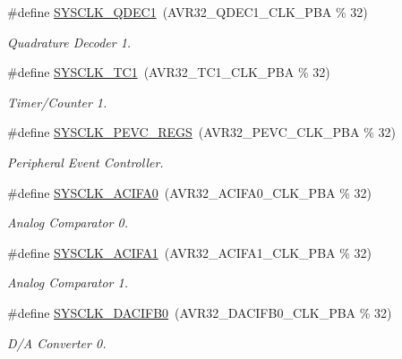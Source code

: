 \begin{DoxyCompactItemize}
\#define \hyperlink{group__sysclk__group_ga82dd53b7213f5e14889c11d00e9172e8}{\-S\-Y\-S\-C\-L\-K\-\_\-\-Q\-D\-E\-C1}~(\-A\-V\-R32\-\_\-\-Q\-D\-E\-C1\-\_\-\-C\-L\-K\-\_\-\-P\-B\-A \% 32)
\begin{DoxyCompactList}\small\item\em \-Quadrature \-Decoder 1. \end{DoxyCompactList}\item 
\#define \hyperlink{group__sysclk__group_ga03be785696a3e76b1b3c6ea6104ac630}{\-S\-Y\-S\-C\-L\-K\-\_\-\-T\-C1}~(\-A\-V\-R32\-\_\-\-T\-C1\-\_\-\-C\-L\-K\-\_\-\-P\-B\-A \% 32)
\begin{DoxyCompactList}\small\item\em \-Timer/\-Counter 1. \end{DoxyCompactList}\item 
\#define \hyperlink{group__sysclk__group_ga399953bbca8665cff37fd74a54196281}{\-S\-Y\-S\-C\-L\-K\-\_\-\-P\-E\-V\-C\-\_\-\-R\-E\-G\-S}~(\-A\-V\-R32\-\_\-\-P\-E\-V\-C\-\_\-\-C\-L\-K\-\_\-\-P\-B\-A \% 32)
\begin{DoxyCompactList}\small\item\em \-Peripheral \-Event \-Controller. \end{DoxyCompactList}\item 
\#define \hyperlink{group__sysclk__group_ga3d96f4df476b374cae0653bb97b6afa9}{\-S\-Y\-S\-C\-L\-K\-\_\-\-A\-C\-I\-F\-A0}~(\-A\-V\-R32\-\_\-\-A\-C\-I\-F\-A0\-\_\-\-C\-L\-K\-\_\-\-P\-B\-A \% 32)
\begin{DoxyCompactList}\small\item\em \-Analog \-Comparator 0. \end{DoxyCompactList}\item 
\#define \hyperlink{group__sysclk__group_gae446ad78f0e97d6284514f1f37b77b8e}{\-S\-Y\-S\-C\-L\-K\-\_\-\-A\-C\-I\-F\-A1}~(\-A\-V\-R32\-\_\-\-A\-C\-I\-F\-A1\-\_\-\-C\-L\-K\-\_\-\-P\-B\-A \% 32)
\begin{DoxyCompactList}\small\item\em \-Analog \-Comparator 1. \end{DoxyCompactList}\item 
\#define \hyperlink{group__sysclk__group_gaca3098d4d705c823acb5a2787a658b2f}{\-S\-Y\-S\-C\-L\-K\-\_\-\-D\-A\-C\-I\-F\-B0}~(\-A\-V\-R32\-\_\-\-D\-A\-C\-I\-F\-B0\-\_\-\-C\-L\-K\-\_\-\-P\-B\-A \% 32)
\begin{DoxyCompactList}\small\item\em \-D/\-A \-Converter 0. \end{DoxyCompactList}\item 

\end{DoxyCompactItemize}
